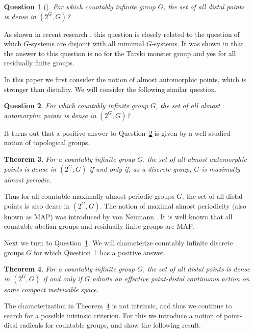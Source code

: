\documentclass[11pt]{amsart}
\newtheorem{theorem}{Theorem}[section]
\newtheorem{question}[theorem]{Question}
\theoremstyle{definition}
\numberwithin{equation}{section}
\theoremstyle{definition}
\begin{document}
\begin{question}[{\cite[Question (2)]{XY}}]\label{XYQ} For which countably infinite group $G$, the set of all distal points is dense in $(2^G, G)$?
\end{question}

As shown in recent research \cite{XY, HSXY}, this question is closely related to the question of which $G$-systems are disjoint with all mimimal $G$-systems. It was shown in \cite{XY} that the answer to this question is no for the Tarski monster group and yes for all residually finite groups.

In this paper we first consider the notion of almost automorphic points, which is stronger than distality. We will consider the following similar question. 

\begin{question}\label{AAP} For which countably infinite group $G$, the set of all almost automorphic points is dense in $(2^G, G)$?
\end{question}

It turns out that a positive answer to Question~\ref{AAP} is given by a well-studied notion of topological groups.

\begin{theorem}\label{thm:main1} For a countably infinite group $G$, the set of all almost automorphic points is dense in $(2^G, G)$ if and only if, as a discrete group, $G$ is maximally almost periodic.
\end{theorem}

Thus for all countable maximally almost periodic groups $G$, the set of all distal points is also dense in $(2^G, G)$. The notion of maximal almost periodicity (also known as MAP) was introduced by von Neumann \cite{vN}. It is well known that all countable abelian groups and residually finite groups are MAP. 

Next we turn to Question~\ref{XYQ}. We will characterize countably infinite discrete groups $G$ for which Question~\ref{XYQ} has a positive answer.

\begin{theorem}\label{thm:main2} For a countably infinite group $G$, the set of all distal points is dense in $(2^G, G)$ if and only if $G$ admits an effective point-distal continuous action on some compact metrizable space.
\end{theorem}

The characterization in Theorem~\ref{thm:main2} is not intrinsic, and thus we continue to search for a possible intrinsic criterion. For this we introduce a notion of point-disal radicals for countable groups, and show the following result.
\end{document}
